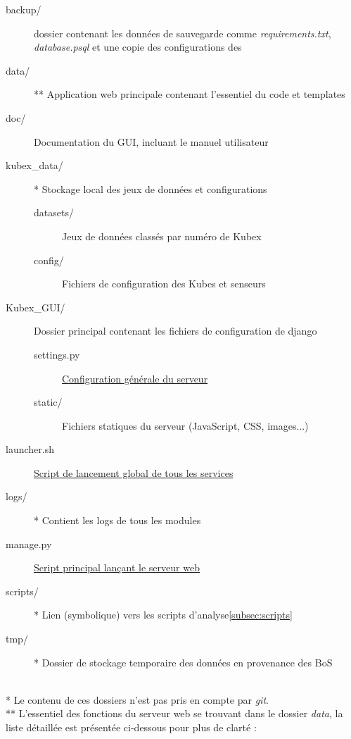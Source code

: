 \documentclass[a4paper]{report}
\begin{document}
\begin{description}
	
	
	\item[backup/] dossier contenant les données de sauvegarde comme \emph{requirements.txt}, \emph{database.psql} et une copie des configurations des 
	\item[data/]** Application web principale contenant l'essentiel du code et templates
	\item[doc/] Documentation du GUI, incluant le manuel utilisateur
	\item[kubex\_data/]* Stockage local des jeux de données et configurations
	\begin{description}
		\item[datasets/] Jeux de données classés par numéro de Kubex
		\item[config/] Fichiers de configuration des Kubes et senseurs
	\end{description}
	\item[Kubex\_GUI/] Dossier principal contenant les fichiers de configuration de django
	\begin{description}
		\item[settings.py] \underline{Configuration générale du serveur}
		\item[static/] Fichiers statiques du serveur (JavaScript, CSS, images...)
	\end{description}
	\item[launcher.sh] \underline{Script de lancement global de tous les services}
	\item[logs/]* Contient les logs de tous les modules
	\item[manage.py] \underline{Script principal lançant le serveur web}
	\item[scripts/]* Lien (symbolique) vers les scripts d'analyse\ref{subsec:scripts}
	\item[tmp/]* Dossier de stockage temporaire des données en provenance des BoS
\end{description}
~\\
* Le contenu de ces dossiers n'est pas pris en compte par \emph{git}.\\
** L'essentiel des fonctions du serveur web se trouvant dans le dossier \emph{data}, la liste détaillée est présentée ci-dessous pour plus de clarté :
 
\end{document}
